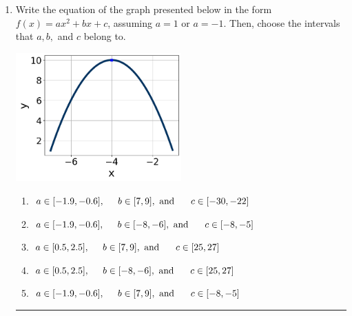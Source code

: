 \documentclass[14pt]{extbook}
\newcommand{\litem}[1]{\item#1\hspace*{-1cm}\rule{\textwidth}{0.4pt}}
\begin{document}
\begin{enumerate}
{\begin{enumerate}[label=\Alph*.]
\end{enumerate} }
\litem{
Write the equation of the graph presented below in the form $f(x)=ax^2+bx+c$, assuming  $a=1$ or $a=-1$. Then, choose the intervals that $a, b,$ and $c$ belong to.
\begin{center}
    \includegraphics[width=0.5\textwidth]{../Figures/quadraticGraphToEquationCopyA.png}
\end{center}
\begin{enumerate}[label=\Alph*.]
\item \( a \in [-1.9, -0.6], \hspace*{5mm} b \in [7, 9], \text{ and } \hspace*{5mm} c \in [-30, -22] \)
\item \( a \in [-1.9, -0.6], \hspace*{5mm} b \in [-8, -6], \text{ and } \hspace*{5mm} c \in [-8, -5] \)
\item \( a \in [0.5, 2.5], \hspace*{5mm} b \in [7, 9], \text{ and } \hspace*{5mm} c \in [25, 27] \)
\item \( a \in [0.5, 2.5], \hspace*{5mm} b \in [-8, -6], \text{ and } \hspace*{5mm} c \in [25, 27] \)
\item \( a \in [-1.9, -0.6], \hspace*{5mm} b \in [7, 9], \text{ and } \hspace*{5mm} c \in [-8, -5] \)


\end{enumerate}}
\end{enumerate}
\end{document}
